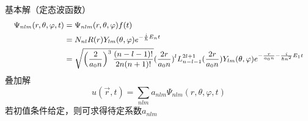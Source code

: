 \begin{frame}
\frametitle{}
基本解（定态波函数）
$$ \small \begin{aligned}
  \Psi _{nlm}(r,\theta,\varphi,t) &= \Psi _{nlm}(r,\theta,\varphi) f(t) \\
  &= N_{nl}R(r)Y_{lm}(\theta,\varphi) e^{-\frac{i}{\hbar} E_n t } \\
  &= \sqrt{\left(\frac{2}{a_0 n}\right)^3 \frac{ (n-l-1)!}{2n (n+1)! }}(\frac{2r}{a_0 n})^l L_{n-l-1} ^{2l+1} (\frac{2r}{a_0 n})   Y_{lm}(\theta,\varphi) e^{-\frac{r}{a_0 n} - \frac{i}{\hbar n^2 }E_1 t }
\end{aligned} $$ 
叠加解 
\[u(\vec{r},t) = \sum_{nlm} a_{nlm} \Psi _{nlm}(r,\theta,\varphi,t) \]
若初值条件给定，则可求得待定系数$a_{nlm}$
\end{frame} 


%
